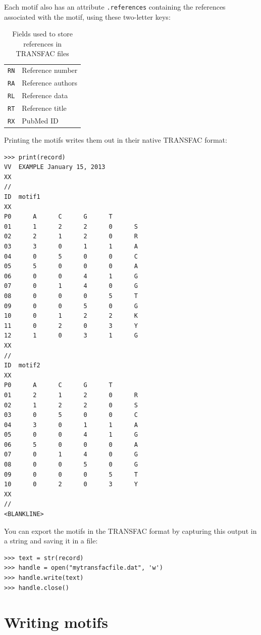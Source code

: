 \documentclass{report}
\begin{document}
Each motif also has an attribute \verb+.references+ containing the
references associated with the motif, using these two-letter keys:

\begin{table}[h]
\begin{center}
\caption{Fields used to store references in TRANSFAC files}
\begin{tabular}{|l|l||}
\verb+RN+ & Reference number \\
\verb+RA+ & Reference authors \\
\verb+RL+ & Reference data \\
\verb+RT+ & Reference title \\
\verb+RX+ & PubMed ID \\
\end{tabular}
\end{center}
\end{table}

Printing the motifs writes them out in their native TRANSFAC format:
\begin{verbatim}
>>> print(record)
VV  EXAMPLE January 15, 2013
XX
//
ID  motif1
XX
P0      A      C      G      T
01      1      2      2      0      S
02      2      1      2      0      R
03      3      0      1      1      A
04      0      5      0      0      C
05      5      0      0      0      A
06      0      0      4      1      G
07      0      1      4      0      G
08      0      0      0      5      T
09      0      0      5      0      G
10      0      1      2      2      K
11      0      2      0      3      Y
12      1      0      3      1      G
XX
//
ID  motif2
XX
P0      A      C      G      T
01      2      1      2      0      R
02      1      2      2      0      S
03      0      5      0      0      C
04      3      0      1      1      A
05      0      0      4      1      G
06      5      0      0      0      A
07      0      1      4      0      G
08      0      0      5      0      G
09      0      0      0      5      T
10      0      2      0      3      Y
XX
//
<BLANKLINE>
\end{verbatim}
You can export the motifs in the TRANSFAC format by capturing this output
in a string and saving it in a file:
\begin{verbatim}
>>> text = str(record)
>>> handle = open("mytransfacfile.dat", 'w')
>>> handle.write(text)
>>> handle.close()
\end{verbatim}

\section{Writing motifs}
\end{document}
